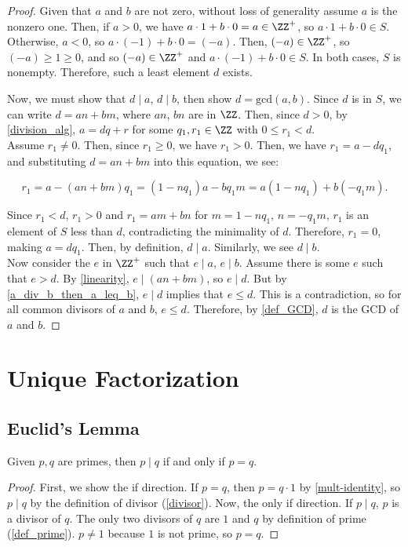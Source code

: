 \begin{proof}
    Given that $a$ and $b$ are not zero, without loss of generality assume $a$ is the nonzero one. Then, if $a > 0$, we have $a \cdot 1 + b \cdot 0 = a \in \ZZ^+$, so $a \cdot 1 + b \cdot 0 \in S$. Otherwise, $a <0$, so $a \cdot (-1) + b \cdot 0 = (-a)$. Then, $(-a) \in \ZZ^+$, so $(-a) \ge 1 \ge 0$, and so $(-a) \in \ZZ^+$ and $a \cdot (-1) + b \cdot 0 \in S$. In both cases, $S$ is nonempty. Therefore, such a least element $d$ exists. 
    
     Now, we must show that $d \mid a$, $d \mid b$, then show $d = \text{gcd} (a,b)$. Since $d$ is in $S$, we can write $d = an + bm$, where $an$, $bn$ are in $\ZZ$. Then, since $d>0$, by \ref{division_alg}, $a=dq+r$ for some $q_1, r_1 \in \ZZ$ with $0 \leq r_1 < d$. \\
     
     Assume $r_1 \neq 0$. Then, since $r_1 \ge 0$, we have $r_1 > 0$. Then, we have $r_1=a-dq_1$, and substituting $d = an + bm$ into this equation, we see:
     
     \begin{equation*}
         r_1=a-(an + bm)q_1 = (1-nq_1)a-bq_1m = a(1-nq_1)+b(-q_1m).
     \end{equation*}
     
     Since $r_1<d$, $r_1 > 0$ and $r_1 = am+bn$ for $m = 1-nq_1$, $n = -q_1m$, $r_1$ is an element of $S$ less than $d$, contradicting the minimality of $d$. Therefore, $r_1 = 0$, making $a=dq_1$. Then, by definition, $d \mid a$. Similarly, we see $d \mid b$. \\

    Now consider the $e$ in $\ZZ^+$ such that $e \mid a$, $e \mid b$. Assume there is some $e$ such that $e > d$. By \ref{linearity}, $e \mid (an+bm)$, so $e \mid d$. But by \ref{a_div_b_then_a_leq_b}, $e \mid d$ implies that $e \leq d$. This is a contradiction, so for all common divisors of $a$ and $b$, $e\le d$. Therefore, by \ref{def_GCD}, $d$ is the GCD of $a$ and $b$. 
\end{proof}
    
\newpage
\section{Unique Factorization}

\subsection{Euclid's Lemma}
\begin{lemma}\label{prime_div_prime}
    Given $p,q$ are primes, then $p\mid q$ if and only if $p=q$.
\end{lemma}
\begin{proof} First, we show the if direction. If $p=q$, then $p=q\cdot 1$ by \ref{mult-identity}, so $p\mid q$ by the definition of divisor (\ref{divisor}). Now, the only if direction. If $p\mid q$, $p$ is a divisor of $q$. The only two divisors of $q$ are $1$ and $q$ by definition of prime (\ref{def_prime}). $p\neq 1$ because $1$ is not prime, so $p=q$.
\end{proof}

